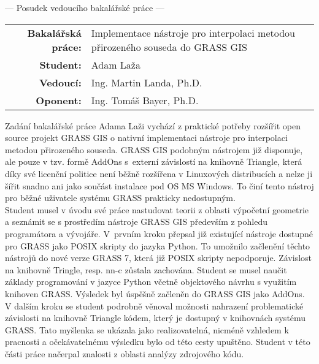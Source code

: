 \documentclass[czech,11pt,a4paper]{article}
\begin{document}
\begin{center}
  {\Large --- Posudek vedoucího bakalářské práce ---}
\end{center}

\vspace{.2cm}

\noindent \begin{tabular}{rp{}}
  {\bf Bakalářská práce:} & Implementace nástroje pro interpolaci metodou přirozeného souseda do GRASS GIS \\
  {\bf Student:} & Adam Laža \\
  {\bf Vedoucí:} & Ing. Martin Landa, Ph.D. \\
  {\bf Oponent:} & Ing. Tomáš Bayer, Ph.D. \\
\end{tabular}

\vspace{1cm}

Zadání bakalářské práce Adama Laži vychází z praktické potřeby
rozšířit open source projekt GRASS GIS o nativní implementaci nástroje
pro interpolaci metodou přirozeného souseda. GRASS GIS podobným
nástrojem již disponuje, ale pouze v tzv. formě AddOns s~externí
závislostí na knihovně Triangle, která díky své licenční politice není
běžně rozšířena v Linuxových distribucích a nelze ji šířit snadno ani
jako součást instalace pod OS MS Windows. To činí tento nástroj pro
běžné uživatele systému GRASS prakticky nedostupným.
\\

Student musel v úvodu své práce nastudovat teorii z oblasti výpočetní
geometrie a seznámit se s prostředím nástroje GRASS GIS především z
pohledu programátora a vývojáře. V~prvním kroku přepsal již existující
nástroje dostupné pro GRASS jako POSIX skripty do jazyka Python. To
umožnilo začlenění těchto nástrojů do nové verze GRASS 7, která již
POSIX skripty nepodporuje. Závislost na knihovně Tringle, resp. nn-c
zůstala zachována. Student se musel naučit základy programování v
jazyce Python včetně objektového návrhu s využitím knihoven
GRASS. Výsledek byl úspěšně začleněn do GRASS GIS jako AddOns.
\\

V dalším kroku se student podrobně věnoval možnosti nahrazení
problematické závislosti na knihovně Triangle kódem, který je dostupný
v knihovnách systému GRASS. Tato myšlenka se ukázala jako
realizovatelná, nicméně vzhledem k pracnosti a očekávatelnému výsledku
bylo od této cesty upuštěno. Student v této části práce načerpal
znalosti z oblasti analýzy zdrojového kódu.
\\
\end{document}
